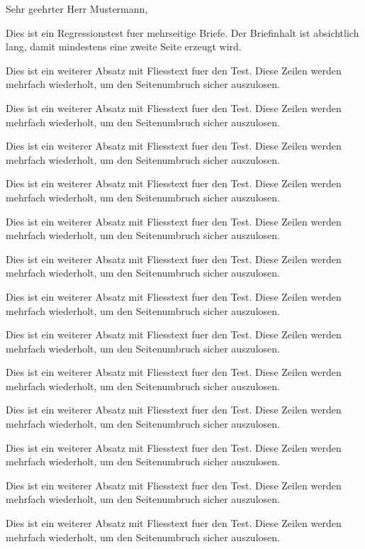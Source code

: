 \documentclass[basic]{../../onlinebrief24}
\begin{document}
\begin{letter}{}
\opening{Sehr geehrter Herr Mustermann,}

Dies ist ein Regressionstest fuer mehrseitige Briefe. Der Briefinhalt ist absichtlich lang, damit mindestens eine zweite Seite erzeugt wird.

\par Dies ist ein weiterer Absatz mit Fliesstext fuer den Test. Diese Zeilen werden mehrfach wiederholt, um den Seitenumbruch sicher auszulosen.
\par Dies ist ein weiterer Absatz mit Fliesstext fuer den Test. Diese Zeilen werden mehrfach wiederholt, um den Seitenumbruch sicher auszulosen.
\par Dies ist ein weiterer Absatz mit Fliesstext fuer den Test. Diese Zeilen werden mehrfach wiederholt, um den Seitenumbruch sicher auszulosen.
\par Dies ist ein weiterer Absatz mit Fliesstext fuer den Test. Diese Zeilen werden mehrfach wiederholt, um den Seitenumbruch sicher auszulosen.
\par Dies ist ein weiterer Absatz mit Fliesstext fuer den Test. Diese Zeilen werden mehrfach wiederholt, um den Seitenumbruch sicher auszulosen.
\par Dies ist ein weiterer Absatz mit Fliesstext fuer den Test. Diese Zeilen werden mehrfach wiederholt, um den Seitenumbruch sicher auszulosen.
\par Dies ist ein weiterer Absatz mit Fliesstext fuer den Test. Diese Zeilen werden mehrfach wiederholt, um den Seitenumbruch sicher auszulosen.
\par Dies ist ein weiterer Absatz mit Fliesstext fuer den Test. Diese Zeilen werden mehrfach wiederholt, um den Seitenumbruch sicher auszulosen.
\par Dies ist ein weiterer Absatz mit Fliesstext fuer den Test. Diese Zeilen werden mehrfach wiederholt, um den Seitenumbruch sicher auszulosen.
\par Dies ist ein weiterer Absatz mit Fliesstext fuer den Test. Diese Zeilen werden mehrfach wiederholt, um den Seitenumbruch sicher auszulosen.
\par Dies ist ein weiterer Absatz mit Fliesstext fuer den Test. Diese Zeilen werden mehrfach wiederholt, um den Seitenumbruch sicher auszulosen.
\par Dies ist ein weiterer Absatz mit Fliesstext fuer den Test. Diese Zeilen werden mehrfach wiederholt, um den Seitenumbruch sicher auszulosen.
\par Dies ist ein weiterer Absatz mit Fliesstext fuer den Test. Diese Zeilen werden mehrfach wiederholt, um den Seitenumbruch sicher auszulosen.

\end{letter}
\end{document}
